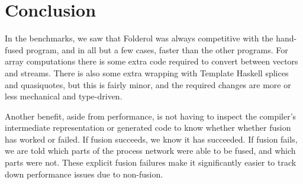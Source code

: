
\section{Conclusion}
In the benchmarks, we saw that Folderol was always competitive with the hand-fused program, and in all but a few cases, faster than the other programs.
For array computations there is some extra code required to convert between vectors and streams.
There is also some extra wrapping with Template Haskell splices and quasiquotes, but this is fairly minor, and the required changes are more or less mechanical and type-driven.

Another benefit, aside from performance, is not having to inspect the compiler's intermediate representation or generated code to know whether whether fusion has worked or failed.
If fusion succeeds, we know it has succeeded.
If fusion fails, we are told which parts of the process network were able to be fused, and which parts were not.
These explicit fusion failures make it significantly easier to track down performance issues due to non-fusion.

